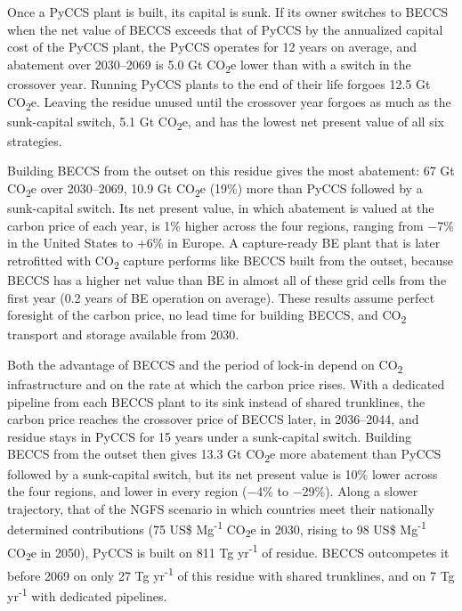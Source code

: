 \documentclass[
  letterpaper,
  twoside,
  twocolumn,
  9pt]{article}
\begin{document}
Once a PyCCS plant is built, its capital is sunk. If its owner switches
to BECCS when the net value of BECCS exceeds that of PyCCS by the
annualized capital cost of the PyCCS plant, the PyCCS operates for 12
years on average, and abatement over 2030--2069 is 5.0 Gt
CO\textsubscript{2}e lower than with a switch in the crossover year.
Running PyCCS plants to the end of their life forgoes 12.5 Gt
CO\textsubscript{2}e. Leaving the residue unused until the crossover
year forgoes as much as the sunk-capital switch, 5.1 Gt
CO\textsubscript{2}e, and has the lowest net present value of all six
strategies.

Building BECCS from the outset on this residue gives the most abatement:
67 Gt CO\textsubscript{2}e over 2030--2069, 10.9 Gt CO\textsubscript{2}e
(19\%) more than PyCCS followed by a sunk-capital switch. Its net
present value, in which abatement is valued at the carbon price of each
year, is 1\% higher across the four regions, ranging from −7\% in the
United States to +6\% in Europe. A capture-ready BE plant that is later
retrofitted with CO\textsubscript{2} capture performs like BECCS built
from the outset, because BECCS has a higher net value than BE in almost
all of these grid cells from the first year (0.2 years of BE operation
on average). These results assume perfect foresight of the carbon price,
no lead time for building BECCS, and CO\textsubscript{2} transport and
storage available from 2030.

Both the advantage of BECCS and the period of lock-in depend on
CO\textsubscript{2} infrastructure and on the rate at which the carbon
price rises. With a dedicated pipeline from each BECCS plant to its sink
instead of shared trunklines, the carbon price reaches the crossover
price of BECCS later, in 2036--2044, and residue stays in PyCCS for 15
years under a sunk-capital switch. Building BECCS from the outset then
gives 13.3 Gt CO\textsubscript{2}e more abatement than PyCCS followed by
a sunk-capital switch, but its net present value is 10\% lower across
the four regions, and lower in every region (−4\% to −29\%). Along a
slower trajectory, that of the NGFS scenario in which countries meet
their nationally determined contributions (75 US\$
Mg\textsuperscript{-1} CO\textsubscript{2}e in 2030, rising to 98 US\$
Mg\textsuperscript{-1} CO\textsubscript{2}e in 2050),\citep{ngfs2026}
PyCCS is built on 811 Tg yr\textsuperscript{-1} of residue. BECCS
outcompetes it before 2069 on only 27 Tg yr\textsuperscript{-1} of this
residue with shared trunklines, and on 7 Tg yr\textsuperscript{-1} with
dedicated pipelines.
\end{document}
